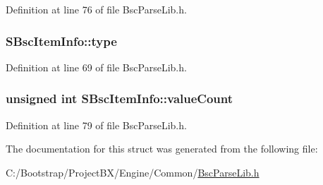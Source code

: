 Definition at line 76 of file BscParseLib.h.\hypertarget{struct_s_bsc_item_info_f37833a5ec26eb203117371dc1dcaab9}{
\subsubsection[{type}]{ {\bf SBscItemInfo::type}}}
\label{struct_s_bsc_item_info_f37833a5ec26eb203117371dc1dcaab9}




Definition at line 69 of file BscParseLib.h.\hypertarget{struct_s_bsc_item_info_1773cffcc05766b60089d45b59786eee}{
\subsubsection[{valueCount}]{\setlength{\rightskip}{0pt plus 5cm}unsigned int {\bf SBscItemInfo::valueCount}}}
\label{struct_s_bsc_item_info_1773cffcc05766b60089d45b59786eee}




Definition at line 79 of file BscParseLib.h.

The documentation for this struct was generated from the following file:\begin{CompactItemize}
\item 
C:/Bootstrap/ProjectBX/Engine/Common/\hyperlink{_bsc_parse_lib_8h}{BscParseLib.h}\end{CompactItemize}
